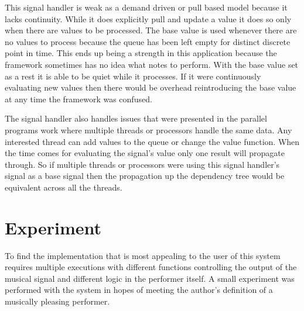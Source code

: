 \documentclass[12pt]{ucthesis}
\begin{document}
This signal handler is weak as a demand driven or pull based model because it lacks continuity. While it does explicitly pull and update a value it does so only when there are values to be processed. The base value is used whenever there are no values to process because the queue has been left empty for distinct discrete point in time. This ends up being a strength in this application because the framework sometimes has no idea what notes to perform. With the base value set as a rest it is able to be quiet while it processes. If it were continuously evaluating new values then there would be overhead reintroducing the base value at any time the framework was confused. 

The signal handler also handles issues that were presented in the parallel programs work where multiple threads or processors handle the same data. Any interested thread can add values to the queue or change the value function. When the time comes for evaluating the signal's value only one result will propagate through. So if multiple threads or processors were using this signal handler's signal as a base signal then the propagation up the dependency tree would be equivalent across all the threads. 


\chapter{Experiment}
\label {experiment}
To find the implementation that is most appealing to the user of this system requires multiple executions with different functions controlling the output of the musical signal and different logic in the performer itself. A small experiment was performed with the system in hopes of meeting the author's definition of a musically pleasing performer. 
\end{document}
